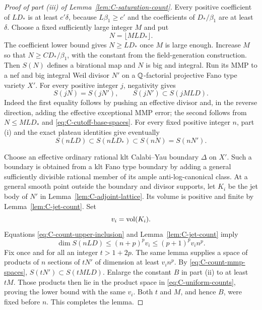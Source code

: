 \begin{proof}[Proof of part \textup{(iii)} of Lemma~\ref{lem:C-saturation-count}]
Every positive coefficient of $LD_*$ is at least $c'\delta$, because
$L\beta_1\geq c'$ and the coefficients of $D_*/\beta_1$ are at
least $\delta$.  Choose a fixed sufficiently large integer $M$ and put
\begin{equation}\label{eq:C-count-polarization}
                              N=\lfloor MLD_*\rfloor.
\end{equation}
The coefficient lower bound gives $N\geq LD_*$ once $M$ is large
enough.  Increase $M$ so that $N\geq C D_*/\beta_1$, with the
constant from the field-generation construction.  Then $S(N)$ defines
a birational map and $N$ is big and integral.  Run its MMP to a nef
and big integral Weil divisor $N'$ on a $\mathbb Q$-factorial projective
Fano type variety $X'$.  For every positive integer $j$, negativity
gives
\begin{equation}\label{eq:C-count-mmp-spaces}
                     S(jN)=S(jN'),\qquad
                              S(jN')\subset S(jMLD).
\end{equation}
Indeed the first equality follows by pushing an effective divisor and,
in the reverse direction, adding the effective exceptional MMP error;
the second follows from $N\leq MLD_*$ and
\eqref{eq:C-cutoff-base-spaces}.  For every fixed positive integer $n$,
part (i) and the exact plateau identities give eventually
\begin{equation}\label{eq:C-count-upper-inclusion}
               S(nLD)\subset S(nLD_*)\subset S(nN)=S(nN').
\end{equation}

Choose an effective ordinary rational klt Calabi--Yau boundary
$\Delta$ on $X'$.  Such a boundary is obtained from a klt Fano type
boundary by adding a general sufficiently divisible rational member
of its ample anti-log-canonical class.  At a general smooth point
outside the boundary and divisor supports, let $K_i$ be the jet body
of $N'$ in Lemma~\ref{lem:C-adjoint-lattice}.  Its volume is positive
and finite by Lemma~\ref{lem:C-jet-count}.  Set
\[
                              v_i=\operatorname{vol}(K_i).
\]
Equations \eqref{eq:C-count-upper-inclusion} and
Lemma~\ref{lem:C-jet-count} imply
\[
 \dim S(nLD)\leq(n+p)^p v_i
                    \leq(p+1)^p v_i n^p.
\]
Fix once and for all an integer $t>1+2p$.  The same lemma supplies a
space of products of $n$ sections of $tN'$ of dimension at least
$v_i n^p$.  By \eqref{eq:C-count-mmp-spaces},
$S(tN')\subset S(tMLD)$.  Enlarge the constant $B$ in part (ii) to
at least $tM$.  Those products then lie in the product space in
\eqref{eq:C-uniform-counts}, proving the lower bound with the same
$v_i$.  Both $t$ and $M$, and hence $B$, were fixed before $n$.
This completes the lemma.
\end{proof}

